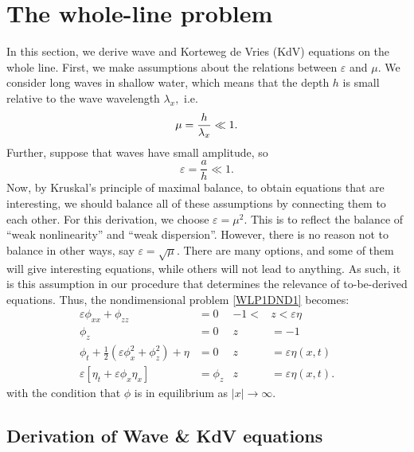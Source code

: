 \documentclass[10pt,reqno,oneside,a4paper]{article}
\begin{document}
\section{The whole-line problem}

In this section, we derive wave and Korteweg de Vries (KdV) equations on the whole line. First, we make assumptions about the relations between $\varepsilon$ and $\mu.$ We consider long waves in shallow water, which means that the depth $h$ is small relative to the wave wavelength $\lambda_x,$ i.e.
\[ \mu = \dfrac{h}{\lambda_x} \ll 1.\]
Further, suppose that waves have small amplitude, so 
\[ \varepsilon = \frac{a}{h} \ll 1. \]
Now, by Kruskal's principle of maximal balance, to obtain equations that are interesting, we should balance all of these assumptions by connecting them to each other. For this derivation, we choose $\varepsilon = \mu^2.$ This is to reflect the balance of ``weak nonlinearity'' and ``weak dispersion''. However, there is no reason not to balance in other ways, say $\varepsilon = \sqrt{\mu}.$ There are many options, and some of them will give interesting equations, while others will not lead to anything. As such, it is this assumption in our procedure that determines the relevance of to-be-derived equations. Thus, the nondimensional problem \eqref{WLP1DND1} becomes:
\begin{subequations}\label{WLP1DND2}
\begin{align}
\label{1PDEND2}  \varepsilon\phi_{xx} + \phi_{zz} &= 0 &-1 <&z < \varepsilon\eta \\
\label{1BC1ND2} \phi_z &= 0 &z &= -1  \\ 
\label{1BC2ND2} \phi_{t} + \frac{1}{2} \left(\varepsilon\phi_{x}^2 + \phi_{z}^2\right) + \eta &= 0 &z &= \varepsilon\eta(x,t)\\
\label{1BC3ND2} \varepsilon\left[\eta_{t} + \varepsilon \phi_{x} \eta_{x}\right] &= \phi_{z} &z &= \varepsilon\eta(x,t).
\end{align}
\end{subequations}
with the condition that $\phi$ is in equilibrium as $|x|\to \infty.$

\subsection{Derivation of Wave \& KdV equations}
\end{document}
